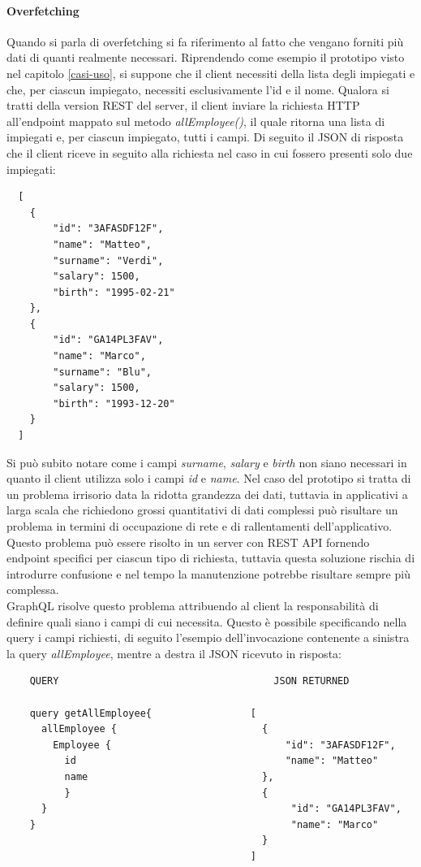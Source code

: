 \paragraph{Overfetching}
Quando si parla di overfetching si fa riferimento al fatto che vengano forniti più dati di quanti realmente necessari. Riprendendo come esempio il prototipo visto nel capitolo \ref{casi-uso}, si suppone che il client necessiti della lista degli impiegati e che, per ciascun impiegato, necessiti  esclusivamente l'id e il nome. Qualora si tratti della version REST del server, il client inviare la richiesta HTTP all'endpoint mappato sul metodo \textit{allEmployee()}, il quale ritorna una lista di impiegati e, per ciascun impiegato, tutti i campi. Di seguito il JSON di risposta che il client riceve in seguito alla richiesta nel caso in cui fossero presenti solo due impiegati:
\begin{verbatim}
  [
    {
        "id": "3AFASDF12F",
        "name": "Matteo",
        "surname": "Verdi",
        "salary": 1500,
        "birth": "1995-02-21"
    },
    {
        "id": "GA14PL3FAV",
        "name": "Marco",
        "surname": "Blu",
        "salary": 1500,
        "birth": "1993-12-20"
    }
  ]
\end{verbatim}
Si può subito notare come i campi \textit{surname}, \textit{salary} e \textit{birth} non siano necessari in quanto il client utilizza solo i campi \textit{id} e \textit{name}. Nel caso del prototipo si tratta di un problema irrisorio data la ridotta grandezza dei dati, tuttavia in applicativi a larga scala che richiedono grossi quantitativi di dati complessi può risultare un problema in termini di occupazione di rete e di rallentamenti dell'applicativo. Questo problema può essere risolto in un server con REST API fornendo endpoint specifici per ciascun tipo di richiesta, tuttavia questa soluzione rischia di introdurre confusione e nel tempo la manutenzione potrebbe risultare sempre più complessa.\\
GraphQL risolve questo problema attribuendo al client la responsabilità di definire quali siano i campi di cui necessita. Questo è possibile specificando nella query i campi richiesti, di seguito l'esempio dell'invocazione contenente a sinistra la query \textit{allEmployee}, mentre a destra il JSON ricevuto in risposta:
\begin{verbatim}
    QUERY                                     JSON RETURNED

    query getAllEmployee{                 [
      allEmployee {                         {
        Employee {                              "id": "3AFASDF12F",
          id                                    "name": "Matteo"
          name                              },
          }                                 {
      }                                          "id": "GA14PL3FAV",
    }                                            "name": "Marco"
                                            }
                                          ]
\end{verbatim}
